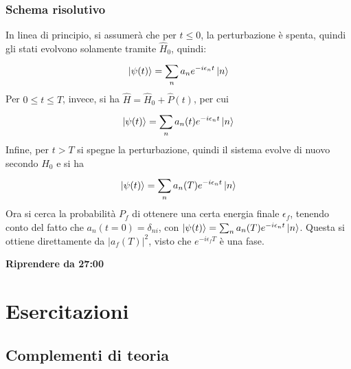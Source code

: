 \documentclass[11pt, a4paper]{scrartcl} %
\numberwithin{equation}{subsection}
\theoremstyle{style2}
\theoremstyle{style1}
\begin{document}
\subsubsection{Schema risolutivo}
In linea di principio, si assumer\`a che per $t\le 0$, la perturbazione \`e spenta, quindi gli stati evolvono solamente tramite $\hat{H}_0$, quindi:
\[
\ket{\psi (t)}  = \sum_{n}^{} a_n e^{-i \epsilon _n t } \ket{n} 
\] 
Per $0\le t \le T$, invece, si ha $\hat{H} = \hat{H}_0 + \hat{P}(t)$, per cui 
\[
\ket{\psi (t)} = \sum_{n}^{} a_n(t) e^{-i\epsilon _n t}  \ket{n} 
\] 
Infine, per $t > T$ si spegne la perturbazione, quindi il sistema evolve di nuovo secondo $\hat{H}_0$ e si ha
\[
\ket{\psi (t)} = \sum_{n}^{} a_n(T) e^{-i \epsilon _n t} \ket{n} 
\] 
Ora si cerca la probabilit\`a $P_f$ di ottenere una certa energia finale $\epsilon _f $, tenendo conto del fatto che $a_n(t=0) = \delta _{ni} $, con $\ket{\psi (t)} = \sum_{n}^{}a_n(T) e^{-i\epsilon _n t}  \ket{n} $.
Questa si ottiene direttamente da $\lvert a_f(T) \rvert ^2$, visto che $e^{-i \epsilon _f T} $ \`e una fase.


\begin{center}
	\bfseries Riprendere da 27:00
\end{center}
















































\newpage
\section{Esercitazioni}
\subsection{Complementi di teoria}
\end{document}
